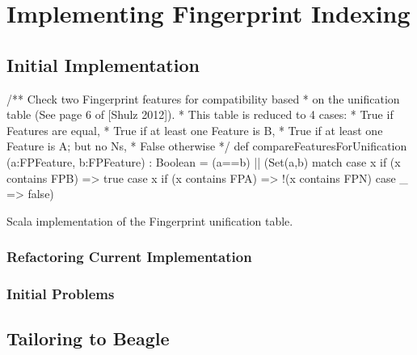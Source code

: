 
\chapter{Implementing Fingerprint Indexing}
\label{cha:method}

\section{Initial Implementation}
\label{sec:initial}


\begin{listing}[H]
\begin{scalacode}
 /** Check two Fingerprint features for compatibility based
   * on the unification table (See page 6 of [Shulz 2012]).
   * This table is reduced to 4 cases:
   *   True if Features are equal,
   *   True if at least one Feature is B,
   *   True if at least one Feature is A; but no Ns,
   *   False otherwise  */
  def compareFeaturesForUnification
         (a:FPFeature, b:FPFeature) : Boolean =
  (a==b) || 
  (Set(a,b) match {
    case x if (x contains FPB) => true
    case x if (x contains FPA) => !(x contains FPN)
    case _ => false})
\end{scalacode}
\caption{Scala implementation of the Fingerprint unification table. \protect\cite[p6]{shulz12}}
\label{lst:example}
\end{listing}

\subsection{Refactoring Current Implementation}

\subsection{Initial Problems}

\section{Tailoring to Beagle}
\label{sec:tailored}

